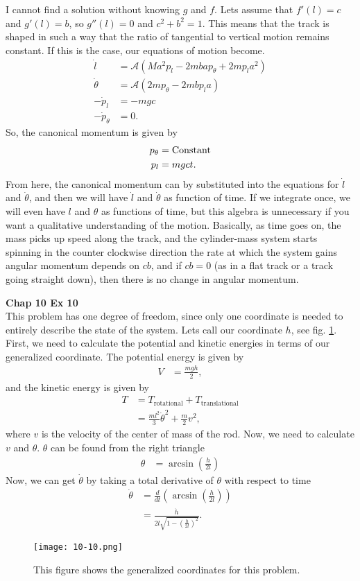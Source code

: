 \documentclass[10pt]{article}
\begin{document}
I cannot find a solution without knowing $g$ and $f$.  Lets assume that $f'(l)=c$ and $g'(l)=b$, so 
$g''(l)=0$ and $c^2+b^2=1$.  This means that the track is shaped in such a way that the ratio of
tangential to vertical motion remains constant.  If this is the case, our equations of motion become.
\begin{align*}
  \dot l &= \mathcal{A} \left( Ma^2p_l - 2mb ap_{\theta} +2m p_l a^2 \right)\\
  \dot \theta &= \mathcal{A} \left( 2mp_{\theta} - 2mbp_l a \right)\\
  -\dot p_l &= -mgc\\
  -\dot p_{\theta} &= 0.
\end{align*}
So, the canonical momentum is given by
\begin{align*}
  p_{\theta} &= \rm{Constant}\\
  p_l &= mgct.
\end{align*}
From here, the canonical momentum can by substituted into the equations for $\dot l$ and $\dot\theta$,
and then we will have $\dot l$ and $\dot\theta$ as function of time.  If we integrate once, we will
even have $l$ and $\theta$ as functions of time, but this algebra is unnecessary if you want a 
qualitative understanding of the motion.  Basically, as time goes on, the mass picks up speed along
the track, and the cylinder-mass system starts spinning in the counter clockwise direction the rate
at which the system gains angular momentum depends on $cb$, and if $cb=0$ (as in a flat track or a 
track going straight down), then there is no change in angular momentum.

\textbf{Chap 10 Ex 10}\\
This problem has one degree of freedom, since only one coordinate is needed to
entirely describe the state of the system.  Lets call our coordinate $h$, see
fig. \ref{fig:10-10}.  First, we need to calculate the potential and kinetic
energies in terms of our generalized coordinate.  The potential energy is given
by
\begin{align*}
  V &= \frac{mgh}{2},
\end{align*}
and the kinetic energy is given by
\begin{align*}
  T &= T_{\textrm{rotational}} + T_{\textrm{translational}}\\
    &= \frac{ml^2}{3}\dot\theta^2 + \frac{m}{2}v^2,
\end{align*}
where $v$ is the velocity of the center of mass of the rod.  Now, we need to
calculate $v$ and $\theta$.  $\theta$ can be found from the right triangle
\begin{align*}
  \theta &= \arcsin\left(\frac{h}{2l}\right)
\end{align*}
Now, we can get $\dot\theta$ by taking a total derivative of $\theta$ with 
respect to time
\begin{align*}
  \dot\theta &= \frac{d}{dt}\left( \arcsin\left(\frac{h}{2l}\right) \right)\\
             &= \frac{\dot h}{2l\sqrt{1-\left( \frac{h}{2l} \right)^2}}.
\end{align*}

\begin{figure}[h!]
    \centering
    \texttt{[image: 10-10.png]}
    \caption{This figure shows the generalized coordinates for this problem.}
  \label{fig:10-10}
\end{figure}
\end{document}
